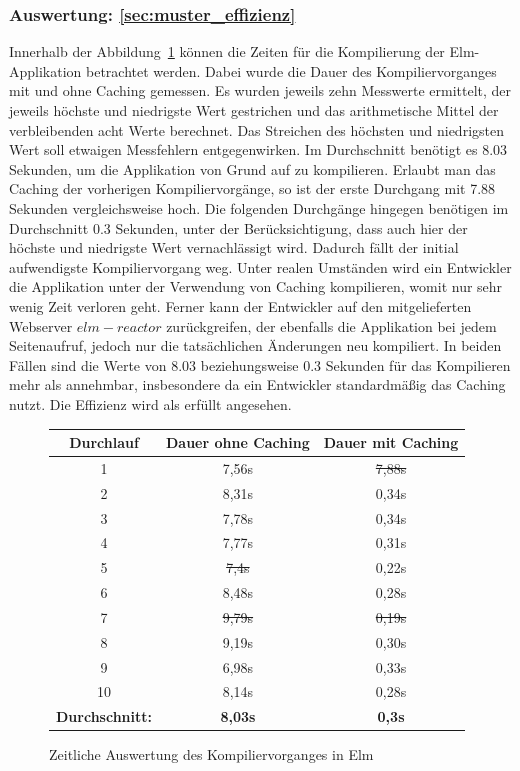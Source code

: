 \subsubsection{Auswertung: \ref{sec:muster_effizienz} }
Innerhalb der Abbildung~\ref{fig:compiler-times} können die Zeiten für die Kompilierung der Elm-Applikation betrachtet werden. Dabei wurde die Dauer des Kompiliervorganges mit und ohne Caching gemessen. Es wurden jeweils zehn Messwerte ermittelt, der jeweils höchste und niedrigste Wert gestrichen und das arithmetische Mittel der verbleibenden acht Werte berechnet. Das Streichen des höchsten und niedrigsten Wert soll etwaigen Messfehlern entgegenwirken. Im Durchschnitt benötigt es 8.03 Sekunden, um die Applikation von Grund auf zu kompilieren. Erlaubt man das Caching der vorherigen Kompiliervorgänge, so ist der erste Durchgang mit 7.88 Sekunden vergleichsweise hoch. Die folgenden Durchgänge hingegen benötigen im Durchschnitt 0.3 Sekunden, unter der Berücksichtigung, dass auch hier der höchste und niedrigste Wert vernachlässigt wird. Dadurch fällt der initial aufwendigste Kompiliervorgang weg. Unter realen Umständen wird ein Entwickler die Applikation unter der Verwendung von Caching kompilieren, womit nur sehr wenig Zeit verloren geht. Ferner kann der Entwickler auf den mitgelieferten Webserver $elm-reactor$ zurückgreifen, der ebenfalls die Applikation bei jedem Seitenaufruf, jedoch nur die tatsächlichen Änderungen neu kompiliert. In beiden Fällen sind die Werte von 8.03 beziehungsweise 0.3 Sekunden für das Kompilieren mehr als annehmbar, insbesondere da ein Entwickler standardmäßig das Caching nutzt. Die Effizienz wird als erfüllt angesehen.
\begin{figure}[h]
\centering
\begin{tabular}{ | c | c | c |}
	\hline
	 \textbf{Durchlauf} 				& \textbf{Dauer ohne Caching} 	& \textbf{Dauer mit Caching}\\
	 \hline
	 1 & 7,56s & \st{7,88s} \\
	 \hline
	 2 & 8,31s & 0,34s\\
	 \hline
	 3 & 7,78s & 0,34s\\
	 \hline
	 4 & 7,77s & 0,31s\\
	 \hline
	 5 & \st{7,4s }& 0,22s\\
	 \hline
	 6 & 8,48s & 0,28s\\
	 \hline
	 7 & \st{9,79s} & \st{0,19s}\\
	 \hline
	 8 & 9,19s & 0,30s\\
	 \hline
	 9 & 6,98s & 0,33s\\
	 \hline
	 10 & 8,14s & 0,28s\\
	 \hhline{|=|=|=|}
	 \textbf{Durchschnitt:} & \textbf{8,03s} & \textbf{0,3s}\\
	 \hline
\end{tabular}
\caption{Zeitliche Auswertung des Kompiliervorganges in Elm}\label{fig:compiler-times}
\end{figure}
